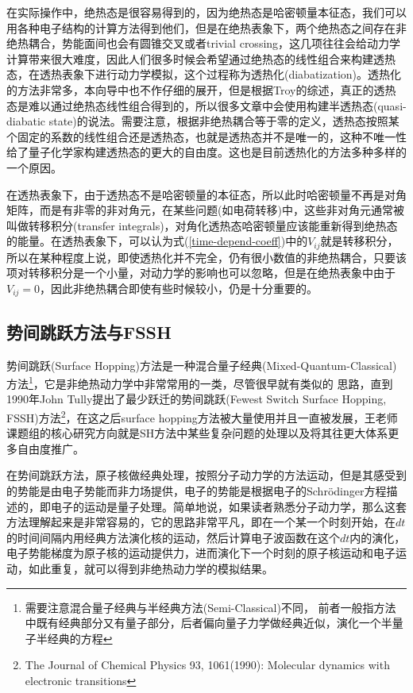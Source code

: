 \documentclass{article}
\numberwithin{equation}{section}
\begin{document}
        在实际操作中，绝热态是很容易得到的，因为绝热态是哈密顿量本征态，我们可以用各种电子结构的计算方法得到他们，但是在绝热表象下，两个绝热态之间存在非绝热耦合，势能面间也会有圆锥交叉或者trivial crossing，这几项往往会给动力学计算带来很大难度，因此人们很多时候会希望通过绝热态的线性组合来构建透热态，在透热表象下进行动力学模拟，这个过程称为透热化(diabatization)。透热化的方法非常多，本向导中也不作仔细的展开，但是根据Troy的综述，真正的透热态是难以通过绝热态线性组合得到的，所以很多文章中会使用构建半透热态(quasi-diabatic state)的说法。需要注意，根据非绝热耦合等于零的定义，透热态按照某个固定的系数的线性组合还是透热态，也就是透热态并不是唯一的，这种不唯一性给了量子化学家构建透热态的更大的自由度。这也是目前透热化的方法多种多样的一个原因。

        在透热表象下，由于透热态不是哈密顿量的本征态，所以此时哈密顿量不再是对角矩阵，而是有非零的非对角元，在某些问题(如电荷转移)中，这些非对角元通常被叫做转移积分(transfer integrals)，对角化透热态哈密顿量应该能重新得到绝热态的能量。在透热表象下，可以认为式(\ref{time-depend-coeff})中的$V_{ij}$就是转移积分，所以在某种程度上说，即使透热化并不完全，仍有很小数值的非绝热耦合，只要该项对转移积分是一个小量，对动力学的影响也可以忽略，但是在绝热表象中由于$V_{ij}=0$，因此非绝热耦合即使有些时候较小，仍是十分重要的。
      \subsection{势间跳跃方法与FSSH}
        势间跳跃(Surface Hopping)方法是一种混合量子经典(Mixed-Quantum-Classical)方法\footnote{需要注意混合量子经典与半经典方法(Semi-Classical)不同，
        前者一般指方法中既有经典部分又有量子部分，后者偏向量子力学做经典近似，演化一个半量子半经典的方程}，它是非绝热动力学中非常常用的一类，尽管很早就有类似的
        思路，直到1990年John Tully提出了最少跃迁的势间跳跃(Fewest Switch Surface Hopping, FSSH)方法\footnote{The Journal of Chemical Physics 93, 1061(1990): Molecular dynamics with electronic transitions}，在这之后surface hopping方法被大量使用并且一直被发展，王老师课题组的核心研究方向就是SH方法中某些复杂问题的处理以及将其往更大体系更多自由度推广。

        在势间跳跃方法，原子核做经典处理，按照分子动力学的方法运动，但是其感受到的势能是由电子势能而非力场提供，电子的势能是根据电子的Schr\"odinger方程描述的，即电子的运动是量子处理。简单地说，如果读者熟悉分子动力学，那么这套方法理解起来是非常容易的，它的思路非常平凡，即在一个某一个时刻开始，在$dt$的时间间隔内用经典方法演化核的运动，然后计算电子波函数在这个$dt$内的演化，电子势能梯度为原子核的运动提供力，进而演化下一个时刻的原子核运动和电子运动，如此重复，就可以得到非绝热动力学的模拟结果。
\end{document}

